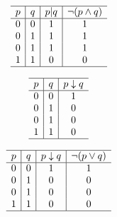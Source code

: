 {{        %
        \begin{practices}
            \begin{table}[H]
                \[
                    \begin{array}{c|c|c|c}
                        \hline
                        p & q & p | q & \neg (p \wedge q) \\
                        \hline
                        0 & 0 & 1 & 1 \\
                        0 & 1 & 1 & 1 \\
                        0 & 1 & 1 & 1 \\
                        1 & 1 & 0 & 0 \\
                        \hline
                   \end{array}
               \]
            \end{table}
        \end{practices}

        \begin{practices}
            \begin{table}[H]
                \[
                    \begin{array}{c|c|c}
                        \hline
                        p & q & p \downarrow q \\
                        \hline
                        0 & 0 & 1 \\
                        0 & 1 & 0 \\
                        0 & 1 & 0 \\
                        1 & 1 & 0 \\
                        \hline
                   \end{array}
               \]
            \end{table}
        \end{practices}

        \begin{practices}
            \begin{table}[H]
                \[
                    \begin{array}{c|c|c|c}
                        \hline
                        p & q & p \downarrow q & \neg (p \vee q) \\
                        \hline
                        0 & 0 & 1 & 1 \\
                        0 & 1 & 0 & 0 \\
                        0 & 1 & 0 & 0 \\
                        1 & 1 & 0 & 0 \\
                        \hline
                   \end{array}
               \]
            \end{table}
        \end{practices}

}}
